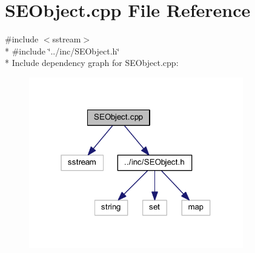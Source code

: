 \section{S\+E\+Object.\+cpp File Reference}
\label{_s_e_object_8cpp}
{\ttfamily \#include $<$sstream$>$}\\*
{\ttfamily \#include \char`\"{}../inc/\+S\+E\+Object.\+h\char`\"{}}\\*
Include dependency graph for S\+E\+Object.\+cpp\+:
\nopagebreak
\begin{figure}[H]
\begin{center}
\leavevmode
\includegraphics[width=265pt]{_s_e_object_8cpp__incl}
\end{center}
\end{figure}
